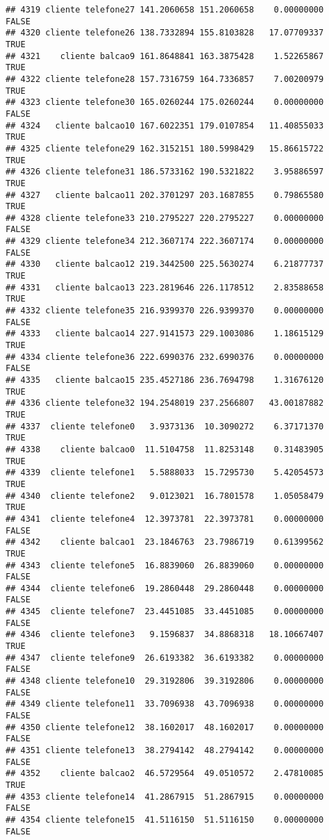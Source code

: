 \documentclass[
]{article}
\begin{document}
\begin{verbatim}
## 4319 cliente telefone27 141.2060658 151.2060658    0.00000000    FALSE
## 4320 cliente telefone26 138.7332894 155.8103828   17.07709337     TRUE
## 4321    cliente balcao9 161.8648841 163.3875428    1.52265867     TRUE
## 4322 cliente telefone28 157.7316759 164.7336857    7.00200979     TRUE
## 4323 cliente telefone30 165.0260244 175.0260244    0.00000000    FALSE
## 4324   cliente balcao10 167.6022351 179.0107854   11.40855033     TRUE
## 4325 cliente telefone29 162.3152151 180.5998429   15.86615722     TRUE
## 4326 cliente telefone31 186.5733162 190.5321822    3.95886597     TRUE
## 4327   cliente balcao11 202.3701297 203.1687855    0.79865580     TRUE
## 4328 cliente telefone33 210.2795227 220.2795227    0.00000000    FALSE
## 4329 cliente telefone34 212.3607174 222.3607174    0.00000000    FALSE
## 4330   cliente balcao12 219.3442500 225.5630274    6.21877737     TRUE
## 4331   cliente balcao13 223.2819646 226.1178512    2.83588658     TRUE
## 4332 cliente telefone35 216.9399370 226.9399370    0.00000000    FALSE
## 4333   cliente balcao14 227.9141573 229.1003086    1.18615129     TRUE
## 4334 cliente telefone36 222.6990376 232.6990376    0.00000000    FALSE
## 4335   cliente balcao15 235.4527186 236.7694798    1.31676120     TRUE
## 4336 cliente telefone32 194.2548019 237.2566807   43.00187882     TRUE
## 4337  cliente telefone0   3.9373136  10.3090272    6.37171370     TRUE
## 4338    cliente balcao0  11.5104758  11.8253148    0.31483905     TRUE
## 4339  cliente telefone1   5.5888033  15.7295730    5.42054573     TRUE
## 4340  cliente telefone2   9.0123021  16.7801578    1.05058479     TRUE
## 4341  cliente telefone4  12.3973781  22.3973781    0.00000000    FALSE
## 4342    cliente balcao1  23.1846763  23.7986719    0.61399562     TRUE
## 4343  cliente telefone5  16.8839060  26.8839060    0.00000000    FALSE
## 4344  cliente telefone6  19.2860448  29.2860448    0.00000000    FALSE
## 4345  cliente telefone7  23.4451085  33.4451085    0.00000000    FALSE
## 4346  cliente telefone3   9.1596837  34.8868318   18.10667407     TRUE
## 4347  cliente telefone9  26.6193382  36.6193382    0.00000000    FALSE
## 4348 cliente telefone10  29.3192806  39.3192806    0.00000000    FALSE
## 4349 cliente telefone11  33.7096938  43.7096938    0.00000000    FALSE
## 4350 cliente telefone12  38.1602017  48.1602017    0.00000000    FALSE
## 4351 cliente telefone13  38.2794142  48.2794142    0.00000000    FALSE
## 4352    cliente balcao2  46.5729564  49.0510572    2.47810085     TRUE
## 4353 cliente telefone14  41.2867915  51.2867915    0.00000000    FALSE
## 4354 cliente telefone15  41.5116150  51.5116150    0.00000000    FALSE

\end{verbatim}
\end{document}
